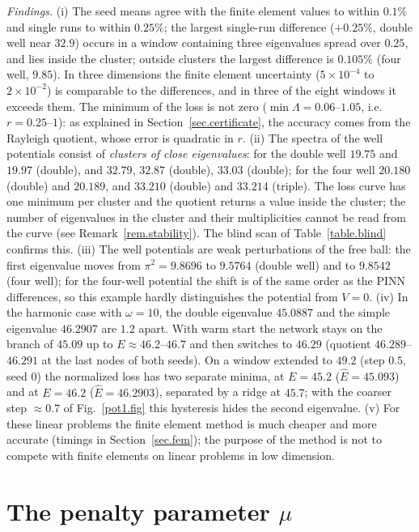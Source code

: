 \documentclass[10pt]{amsart}
\theoremstyle{definition}
\theoremstyle{remark}
\theoremstyle{plain}
\begin{document}
\emph{Findings.} (i) The seed means agree with the finite element values to within $0.1\%$ and single
runs to within $0.25\%$; the largest single-run difference ($+0.25\%$, double well near $32.9$) occurs in
a window containing three eigenvalues spread over $0.25$, and lies inside the cluster; outside clusters
the largest difference is $0.105\%$ (four well, $9.85$). In three dimensions the finite element
uncertainty ($5\times10^{-4}$ to $2\times10^{-2}$) is comparable to the differences, and in three of the
eight windows it exceeds them. The minimum of the loss is not zero ($\min\Lambda=0.06$--$1.05$, i.e.\
$r=0.25$--$1$): as explained in Section~\ref{sec.certificate}, the accuracy comes from the Rayleigh
quotient, whose error is quadratic in $r$. (ii) The spectra of the well potentials consist of
\emph{clusters of close eigenvalues}: for the double well $19.75$ and $19.97$ (double), and $32.79$,
$32.87$ (double), $33.03$ (double); for the four well $20.180$ (double) and $20.189$, and $33.210$
(double) and $33.214$ (triple). The loss curve has one minimum per cluster and the quotient returns a
value inside the cluster; the number of eigenvalues in the cluster and their multiplicities cannot be
read from the curve (see Remark~\ref{rem.stability}). The blind scan of Table~\ref{table.blind} confirms
this. (iii) The well potentials are weak perturbations of the free ball: the first eigenvalue moves from
$\pi^2=9.8696$ to $9.5764$ (double well) and to $9.8542$ (four well); for the four-well potential the
shift is of the same order as the PINN differences, so this example hardly distinguishes the potential
from $V=0$. (iv) In the harmonic case with $\omega=10$, the double eigenvalue $45.0887$ and the simple
eigenvalue $46.2907$ are $1.2$ apart. With warm start the network stays on the branch of $45.09$ up to
$E\approx46.2$--$46.7$ and then switches to $46.29$ (quotient $46.289$--$46.291$ at the last nodes of both
seeds). On a window extended to $49.2$ (step $0.5$, seed 0) the normalized loss has two separate minima,
at $E=45.2$ ($\hat E=45.093$) and at $E=46.2$ ($\hat E=46.2903$), separated by a ridge at $45.7$; with the
coarser step $\approx0.7$ of Fig.~\ref{pot1.fig} this hysteresis hides the second eigenvalue. (v) For
these linear problems the finite element method is much cheaper and more accurate (timings in
Section~\ref{sec.fem}); the purpose of the method is not to compete with finite elements on linear
problems in low dimension.

\section{The penalty parameter \texorpdfstring{$\mu$}{mu}}\label{sec.mu}
\end{document}
